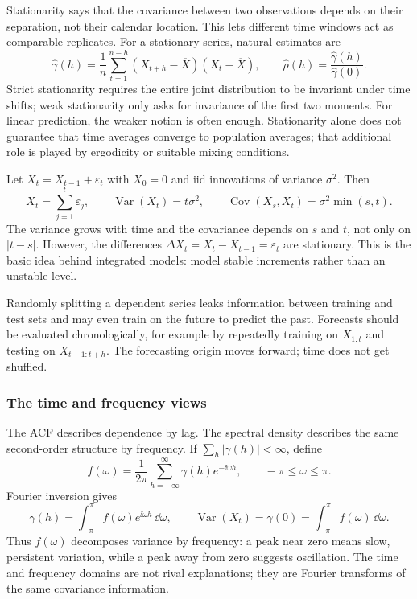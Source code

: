 Stationarity says that the covariance between two observations depends on their
separation, not their calendar location. This lets different time windows act as
comparable replicates. For a stationary series, natural estimates are
\[
    \widehat{\gamma}(h)
    =\frac{1}{n}\sum_{t=1}^{n-h}(X_{t+h}-\overline{X})(X_t-\overline{X}),
    \qquad
    \widehat{\rho}(h)=\frac{\widehat{\gamma}(h)}{\widehat{\gamma}(0)}.
\]
Strict stationarity requires the entire joint distribution to be invariant under
time shifts; weak stationarity only asks for invariance of the first two moments.
For linear prediction, the weaker notion is often enough. Stationarity alone does
not guarantee that time averages converge to population averages; that additional
role is played by ergodicity or suitable mixing conditions.

\begin{exam}
Let $X_t=X_{t-1}+\varepsilon_t$ with $X_0=0$ and iid innovations of variance
$\sigma^2$. Then
\[
    X_t=\sum_{j=1}^t\varepsilon_j,
    \qquad
    \operatorname{Var}(X_t)=t\sigma^2,
    \qquad
    \operatorname{Cov}(X_s,X_t)=\sigma^2\min(s,t).
\]
The variance grows with time and the covariance depends on $s$ and $t$, not only
on $|t-s|$. However, the differences
$\Delta X_t=X_t-X_{t-1}=\varepsilon_t$ are stationary. This is the basic idea
behind integrated models: model stable increments rather than an unstable level.
\end{exam}

\begin{rem}
Randomly splitting a dependent series leaks information between training and
test sets and may even train on the future to predict the past. Forecasts should
be evaluated chronologically, for example by repeatedly training on
$X_{1:t}$ and testing on $X_{t+1:t+h}$. The forecasting origin moves forward;
time does not get shuffled.
\end{rem}

\subsubsection{The time and frequency views}
The ACF describes dependence by lag. The spectral density describes the same
second-order structure by frequency. If $\sum_h|\gamma(h)|<\infty$, define
\[
    f(\omega)
    =\frac{1}{2\pi}\sum_{h=-\infty}^{\infty}\gamma(h)e^{-\ii\omega h},
    \qquad -\pi\leq\omega\leq\pi.
\]
Fourier inversion gives
\[
    \gamma(h)=\int_{-\pi}^{\pi}f(\omega)e^{\ii\omega h}\,\dd\omega,
    \qquad
    \operatorname{Var}(X_t)=\gamma(0)=\int_{-\pi}^{\pi}f(\omega)\,\dd\omega.
\]
Thus $f(\omega)$ decomposes variance by frequency: a peak near zero means slow,
persistent variation, while a peak away from zero suggests oscillation. The time
and frequency domains are not rival explanations; they are Fourier transforms of
the same covariance information.

